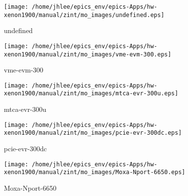 \noindent
\vspace{1.4cm}
\begin{minipage}{.2\textwidth}
\begin{center}
\texttt{[image: /home/jhlee/epics\_env/epics-Apps/hw-xenon1900/manual/zint/mo\_images/undefined.eps]}
\end{center}
\end{minipage}
\begin{minipage}{.7\textwidth}
undefined
\end{minipage}


\noindent
\vspace{1.4cm}
\begin{minipage}{.2\textwidth}
\begin{center}
\texttt{[image: /home/jhlee/epics\_env/epics-Apps/hw-xenon1900/manual/zint/mo\_images/vme-evm-300.eps]}
\end{center}
\end{minipage}
\begin{minipage}{.7\textwidth}
vme-evm-300
\end{minipage}


\noindent
\vspace{1.4cm}
\begin{minipage}{.2\textwidth}
\begin{center}
\texttt{[image: /home/jhlee/epics\_env/epics-Apps/hw-xenon1900/manual/zint/mo\_images/mtca-evr-300u.eps]}
\end{center}
\end{minipage}
\begin{minipage}{.7\textwidth}
mtca-evr-300u
\end{minipage}


\noindent
\vspace{1.4cm}
\begin{minipage}{.2\textwidth}
\begin{center}
\texttt{[image: /home/jhlee/epics\_env/epics-Apps/hw-xenon1900/manual/zint/mo\_images/pcie-evr-300dc.eps]}
\end{center}
\end{minipage}
\begin{minipage}{.7\textwidth}
pcie-evr-300dc
\end{minipage}


\noindent
\vspace{1.4cm}
\begin{minipage}{.2\textwidth}
\begin{center}
\texttt{[image: /home/jhlee/epics\_env/epics-Apps/hw-xenon1900/manual/zint/mo\_images/Moxa-Nport-6650.eps]}
\end{center}
\end{minipage}
\begin{minipage}{.7\textwidth}
Moxa-Nport-6650
\end{minipage}


